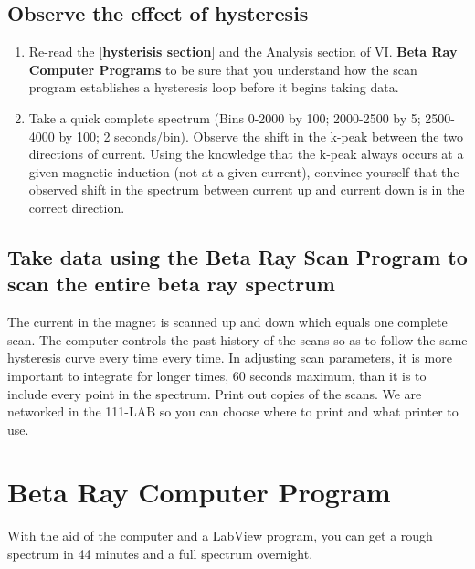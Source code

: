 \documentclass{../lab}
\begin{document}
\subsection{Observe the effect of hysteresis}

\begin{enumerate}
    \item Re-read the [\href{http://experimentationlab.berkeley.edu/Hysteresis}{\textbf{hysterisis section}}] and the Analysis section of VI. \textbf{Beta Ray Computer Programs} to be sure that you understand how the scan program establishes a hysteresis loop before it begins taking data.

    \item Take a quick complete spectrum (Bins 0-2000 by 100; 2000-2500 by 5; 2500-4000 by 100; 2 seconds/bin). Observe the shift in the k-peak between the two directions of current. Using the knowledge that the k-peak always occurs at a given magnetic induction (not at a given current), convince yourself that the observed shift in the spectrum between current up and current down is in the correct direction.

\end{enumerate}

\subsection{Take data using the Beta Ray Scan Program to scan the entire beta ray spectrum}

The current in the magnet is scanned up and down which equals one complete scan. The computer controls the past history of the scans so as to follow the same hysteresis curve every time every time. In adjusting scan parameters, it is more important to integrate for longer times, 60 seconds maximum, than it is to include every point in the spectrum. Print out copies of the scans. We are networked in the 111-LAB so you can choose where to print and what printer to use.

\section{Beta Ray Computer Program}

With the aid of the computer and a LabView program, you can get a rough spectrum in 44 minutes and a full spectrum overnight.
\end{document}
